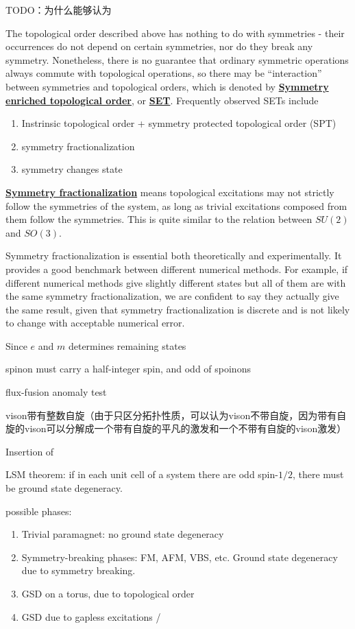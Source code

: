 \documentclass[hyperref, UTF8, a4paper]{ctexart}
\newcommand*{\concept}[1]{\underline{\textbf{#1}}}
\begin{document}
TODO：为什么能够认为

The topological order described above has nothing to do with symmetries - their occurrences do not depend on certain symmetries, nor do they break any symmetry.
Nonetheless, there is no guarantee that ordinary symmetric operations always commute with topological operations, so there may be ``interaction'' between symmetries and topological orders, which is denoted by \concept{Symmetry enriched topological order}, or \concept{SET}.
Frequently observed SETs include
\begin{enumerate}
    \item Instrinsic topological order + symmetry protected topological order (SPT)
    \item symmetry fractionalization
    \item symmetry changes state
\end{enumerate}

\concept{Symmetry fractionalization} means topological excitations may not strictly follow the symmetries of the system, as long as trivial excitations composed from them follow the symmetries.
This is quite similar to the relation between $SU(2)$ and $SO(3)$.

Symmetry fractionalization is essential both theoretically and experimentally. It provides a good benchmark between different numerical methods. For example, if different numerical methods give slightly different states but all of them are with the same symmetry fractionalization, we are confident to say they actually give the same result, given that symmetry fractionalization is discrete and is not likely to change with acceptable numerical error.

Since $e$ and $m$ determines remaining states

spinon must carry a half-integer spin, and odd  of spoinons 

flux-fusion anomaly test

vison带有整数自旋（由于只区分拓扑性质，可以认为vison不带自旋，因为带有自旋的vison可以分解成一个带有自旋的平凡的激发和一个不带有自旋的vison激发）

Insertion of 

LSM theorem: if in each unit cell of a system there are odd spin-$1/2$, there must be ground state degeneracy.

possible phases:

\begin{enumerate}
    \item Trivial paramagnet: no ground state degeneracy
    \item Symmetry-breaking phases: FM, AFM, VBS, etc. Ground state degeneracy due to symmetry breaking.
    \item GSD on a torus, due to topological order
    \item GSD due to gapless excitations / 
\end{enumerate}
\end{document}

